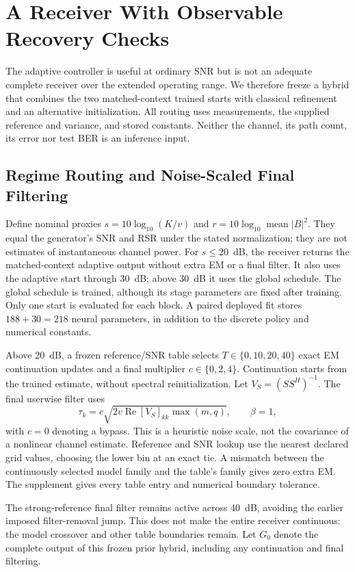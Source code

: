 \section{A Receiver With Observable Recovery Checks}
\label{sec:receiver}
The adaptive controller is useful at ordinary SNR but is not an adequate complete receiver over the extended operating range. We therefore freeze a hybrid that combines the two matched-context trained starts with classical refinement and an alternative initialization. All routing uses measurements, the supplied reference and variance, and stored constants. Neither the channel, its path count, its error nor test BER is an inference input.

\subsection{Regime Routing and Noise-Scaled Final Filtering}
Define nominal proxies $s=10\log_{10}(K/v)$ and $r=10\log_{10}\operatorname{mean}|B|^2$. They equal the generator's SNR and RSR under the stated normalization; they are not estimates of instantaneous channel power. For $s\le20$~dB, the receiver returns the matched-context adaptive output without extra EM or a final filter. It also uses the adaptive start through 30~dB; above 30~dB it uses the global schedule. The global schedule is trained, although its stage parameters are fixed after training. Only one start is evaluated for each block. A paired deployed fit stores $188+30=218$ neural parameters, in addition to the discrete policy and numerical constants.

Above 20~dB, a frozen reference/SNR table selects $T\in\{0,10,20,40\}$ exact EM continuation updates and a final multiplier $c\in\{0,2,4\}$. Continuation starts from the trained estimate, without spectral reinitialization. Let $V_S=(SS^H)^{-1}$. The final userwise filter uses
\begin{equation}
 \tau_k=c\sqrt{2v\operatorname{Re}[V_S]_{kk}\max(m,q)},\qquad \beta=1,
 \label{eq:finaltau}
\end{equation}
with $c=0$ denoting a bypass. This is a heuristic noise scale, not the covariance of a nonlinear channel estimate. Reference and SNR lookup use the nearest declared grid values, choosing the lower bin at an exact tie. A mismatch between the continuously selected model family and the table's family gives zero extra EM. The supplement gives every table entry and numerical boundary tolerance.

The strong-reference final filter remains active across 40~dB, avoiding the earlier imposed filter-removal jump. This does not make the entire receiver continuous: the model crossover and other table boundaries remain. Let $G_0$ denote the complete output of this frozen prior hybrid, including any continuation and final filtering.

